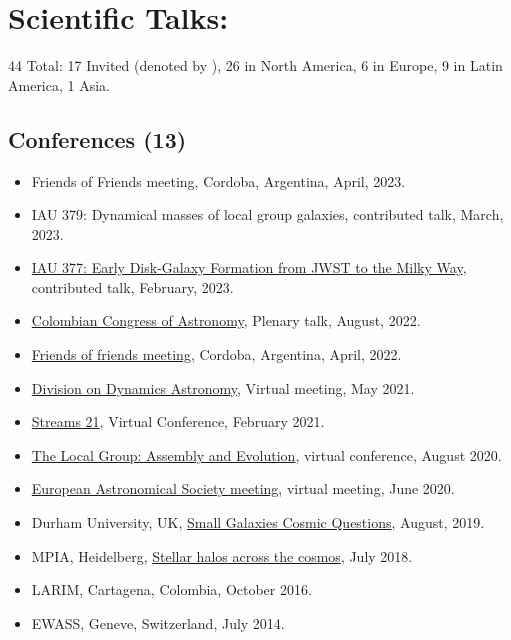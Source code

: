 \documentclass[UTF8]{article}
\begin{document}
\section*{Scientific Talks:}

44 Total: 17 Invited (denoted by \dag), 26 in North America, 6 in Europe, 9 in Latin America, 1 Asia.\\


\subsection*{Conferences (13)}



\begin{itemize}
  \setlength\itemsep{0.0em}
  \renewcommand\labelitemi{$\cdot$}

\item Friends of Friends meeting, Cordoba, Argentina, April, 2023. \dag
\item IAU 379: Dynamical masses of local group galaxies, contributed talk, March, 2023.
\item \href{https://www.mso.anu.edu.au/~yting/Malaysia_IAU/}{IAU 377: Early Disk-Galaxy Formation
from JWST to the Milky Way}, contributed talk, February, 2023.
\item \href{https://accefyn.com/microsites/nodos/astroco/congreso-colombiano-de-astronomia-cocoa-2022%E2%80%8B/}{Colombian Congress of Astronomy}, Plenary talk, August, 2022. \dag
\item \href{http://fof.oac.uncor.edu/2022/}{Friends of friends meeting}, Cordoba, Argentina, April, 2022.
\item \href{https://aas.org/meetings/dda52}{Division on Dynamics Astronomy}, Virtual meeting, May 2021.
\item \href{https://stellarstreams.org/streams21/}{Streams 21}, Virtual
  Conference, February 2021. 
\item  \href{https://www.stsci.edu/contents/events/stsci/2020/april/the-local-group-assembly-and-evolution?page=2&filterUUID=6fedb8a7-}{The Local Group: Assembly and Evolution}, virtual conference, August 2020.
\item \href{https://eas.unige.ch/EAS2020/}{European Astronomical Society meeting}, virtual meeting, June 2020.
\item Durham University, UK, \href{http://astro.dur.ac.uk/cosmodwarfs/}{Small Galaxies Cosmic Questions}, August, 2019.
\item MPIA, Heidelberg, \href{http://www.mpia.de/homes/stellarhalos2018-loc/sh2018/index.html}{Stellar halos across the cosmos}, July 2018.
\item LARIM, Cartagena, Colombia, October 2016.
\item EWASS, Geneve, Switzerland, July 2014.
\end{itemize}
  
\end{document}
